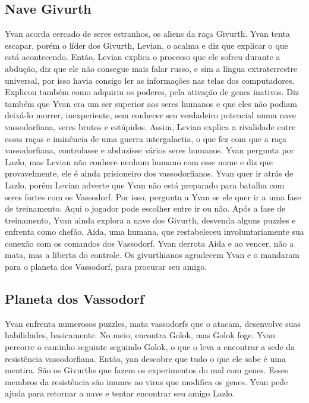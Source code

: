 \documentclass[12pt, a4paper]{article}
\begin{document}
	\subsection{Nave Givurth}

	Yvan acorda cercado de seres estranhos, os aliens da raça Givurth.
    Yvan tenta escapar, porém o líder dos Givurth, Levian, o acalma e diz
    que explicar o que está acontecendo. Então, Levian explica o processo
    que ele sofreu durante a abdução, diz que ele não consegue mais falar
    russo, e sim a língua extraterrestre universal, por isso havia 
    consigo ler as informações nas telas dos computadores. Explicou 
    também como adquiriu os poderes, pela ativação de genes inativos.
    Diz também que Yvan era um ser superior aos seres humanos e que eles
    não podiam deixá-lo morrer, inexperiente, sem conhecer seu 
    verdadeiro potencial numa nave vassodorfiana, seres brutos e 
    estúpidos. Assim, Levian explica a rivalidade entre essas raças e 
    iminência de uma guerra intergalactia, o que fez com que a raça 
    vassodorfiana, controlasse e abduzisse vários seres humanos. Yvan 
    pergunta por Lazlo, mas Levian não conhece nenhum humano com esse 
    nome e diz que provavelmente, ele é ainda prisioneiro dos 
    vassodorfianos. Yvan quer ir atrás de Lazlo, porém Levian adverte 
    que Yvan não está preparado para batalha com seres fortes com os 
    Vassodorf. Por isso, pergunta a Yvan se ele quer ir a uma fase de 
    treinamento. Aqui o jogador pode escolher entre ir ou não. Após a 
    fase de treinamento, Yvan ainda explora a nave dos Givurth, desvenda 
    alguns puzzles e enfrenta como chefão, Aida, uma humana, que 
    restabeleceu involuntariamente sua conexão com os comandos dos 
    Vassodorf. Yvan derrota Aida e ao vencer, não a mata, mas a liberta 
    do controle. Os givurthianos agradecem Yvan e o mandaram para o 
    planeta dos Vassodorf, para procurar seu amigo.
	
	\subsection{Planeta dos Vassodorf}

	Yvan enfrenta numerosos puzzles, mata vassodorfs que o atacam, 
    desenvolve suas habilidades, basicamente. No meio, encontra Golok, 
    mas Golok foge. Yvan percorre o caminho seguinte seguindo Golok, o 
    que o leva a encontrar a sede da resistência vassodorfiana. Então,
    yan descobre que tudo o que ele sabe é uma mentira. São os Givurths
    que fazem os experimentos do mal com genes. Esses membros da 
    resistência são imunes ao virus que modifica os genes. Yvan pede 
    ajuda para retornar a nave e tentar encontrar seu amigo Lazlo.
\end{document}
